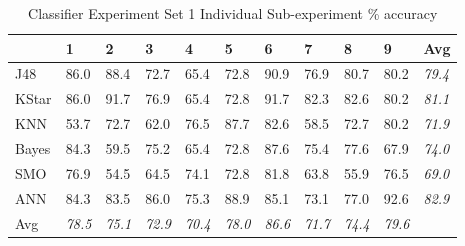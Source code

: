 \documentclass[../thesis/thesis.tex]{subfiles}
\begin{document}
\begin{landscape}
\begin{table}
\centering
\begin{tabular}{|l|l|l|l|l|l|l|l|l|l|l|}
\hline
      & \textbf{1}     & \textbf{2}     & \textbf{3}     & \textbf{4}     & \textbf{5}     & \textbf{6}     & \textbf{7}     & \textbf{8}     & \textbf{9}     & \textbf{Avg}   \\ \hline
J48   & 86.0           & 88.4           & 72.7           & 65.4           & 72.8           & 90.9           & 76.9           & 80.7           & 80.2           & \textit{79.4}  \\ \hline
KStar & 86.0           & 91.7           & 76.9           & 65.4           & 72.8           & 91.7           & 82.3           & 82.6           & 80.2           & \textit{81.1}  \\ \hline
KNN   & 53.7           & 72.7           & 62.0           & 76.5           & 87.7           & 82.6           & 58.5           & 72.7           & 80.2           & \textit{71.9}  \\ \hline
Bayes & 84.3           & 59.5           & 75.2           & 65.4           & 72.8           & 87.6           & 75.4           & 77.6           & 67.9           & \textit{74.0}  \\ \hline
SMO   & 76.9           & 54.5           & 64.5           & 74.1           & 72.8           & 81.8           & 63.8           & 55.9           & 76.5           & \textit{69.0}  \\ \hline
ANN   & 84.3           & 83.5           & 86.0           & 75.3           & 88.9           & 85.1           & 73.1           & 77.0           & 92.6           & \textit{82.9}  \\ \hline
Avg   & \textit{78.5}  & \textit{75.1}  & \textit{72.9}  & \textit{70.4}  & \textit{78.0}  & \textit{86.6}  & \textit{71.7}  & \textit{74.4}  & \textit{79.6}  &                \\ \hline
\end{tabular}
\caption{Classifier Experiment Set 1 Individual Sub-experiment \% accuracy}
\label{tab:results:set1percent}
\end{table}


\end{landscape}
\end{document}
